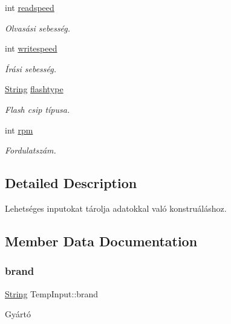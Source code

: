 \begin{DoxyCompactItemize}
int \mbox{\hyperlink{struct_temp_input_a75c5e55813802a9d6af6818de81e6001}{readspeed}}
\begin{DoxyCompactList}\small\item\em Olvasási sebesség. \end{DoxyCompactList}\item 
int \mbox{\hyperlink{struct_temp_input_a3d5511c959e7c3531ce3bea3a6248d62}{writespeed}}
\begin{DoxyCompactList}\small\item\em Írási sebesség. \end{DoxyCompactList}\item 
\mbox{\hyperlink{class_string}{String}} \mbox{\hyperlink{struct_temp_input_aca0d9830369aab845fc274c6b54ffe33}{flashtype}}
\begin{DoxyCompactList}\small\item\em Flash csip típusa. \end{DoxyCompactList}\item 
int \mbox{\hyperlink{struct_temp_input_a661104db14326156bbb2ffa5a7c6f468}{rpm}}
\begin{DoxyCompactList}\small\item\em Fordulatszám. \end{DoxyCompactList}\end{DoxyCompactItemize}


\subsection{Detailed Description}
Lehetséges inputokat tárolja adatokkal való konstruáláshoz. 

\subsection{Member Data Documentation}
\mbox{\label{struct_temp_input_ae61ec1c3c483e583e4975e5c728e4886}} 
\subsubsection{\texorpdfstring{brand}{brand}}
{\footnotesize\ttfamily \mbox{\hyperlink{class_string}{String}} Temp\+Input\+::brand}



Gyártó 

\mbox{\label{struct_temp_input_a29da394f96dae5eaa49e145207362a9c}} 
